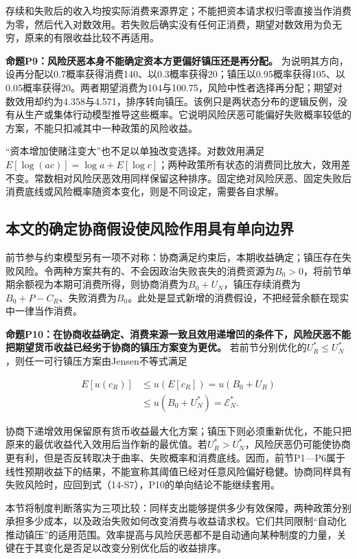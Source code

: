 \documentclass[UTF8,fontset=windows,12pt,a4paper,oneside,openany]{ctexbook}
\begin{document}
存续和失败后的收入均按实际消费来源界定；不能把资本请求权归零直接当作消费为零，然后代入对数效用。若失败后确实没有任何正消费，期望对数效用为负无穷，原来的有限收益比较不再适用。

\textbf{命题P9：风险厌恶本身不能确定资本方更偏好镇压还是再分配。} 为说明其方向，设再分配以0.7概率获得消费140、以0.3概率获得20；镇压以0.95概率获得105、以0.05概率获得20。两者期望消费为104与100.75，风险中性者选择再分配；期望对数效用却约为4.358与4.571，排序转向镇压。该例只是两状态分布的逻辑反例，没有从生产或集体行动模型推导这些概率。它说明风险厌恶可能偏好失败概率较低的方案，不能只扣减其中一种政策的风险收益。

“资本增加使赌注变大”也不足以单独改变选择。对数效用满足$E[\log(ac)]=\log a+E[\log c]$；两种政策所有状态的消费同比放大，效用差不变。常数相对风险厌恶效用同样保留这种排序。固定绝对风险厌恶、固定失败后消费底线或风险概率随资本变化，则是不同设定，需要各自求解。

\subsection{本文的确定协商假设使风险作用具有单向边界}

前节参与约束模型另有一项不对称：协商满足约束后，本期收益确定；镇压存在失败风险。令两种方案共有的、不会因政治失败丧失的消费资源为$B_0>0$，将前节单期余额视为本期可消费所得，则协商消费为$B_0+U_N$，镇压存续消费为$B_0+P-C_R$、失败消费为$B_0$。此处是显式新增的消费假设，不把经营余额在现实中一律当作消费。

\textbf{命题P10：在协商收益确定、消费来源一致且效用递增凹的条件下，风险厌恶不能把期望货币收益已经劣于协商的镇压方案变为更优。} 若前节分别优化的$U_R^*\leq U_N^*$，则任一可行镇压方案由Jensen不等式满足

\[
\begin{aligned}
E[u(c_R)]&\leq u(E[c_R])=u(B_0+U_R)\\
 &\leq u(B_0+U_N^*)=\mathcal E_N^*.
\end{aligned}
\tag{14-S8}
\]

协商下递增效用保留原有货币收益最大化方案；镇压下则必须重新优化，不能只把原来的最优收益代入效用后当作新的最优值。若$U_R^*>U_N^*$，风险厌恶仍可能使协商更有利，但是否反转取决于曲率、失败概率和消费底线。因而，前节P1—P6属于线性预期收益下的结果，不能宣称其阈值已经对任意风险偏好稳健。协商同样具有失败风险时，应回到式（14-S7），P10的单向结论不能继续套用。

本节将制度判断落实为三项比较：同样支出能够提供多少有效保障，两种政策分别承担多少成本，以及政治失败如何改变消费与收益请求权。它们共同限制“自动化推动镇压”的适用范围。效率提高与风险厌恶都不是自动通向某种制度的力量，关键在于其变化是否足以改变分别优化后的收益排序。
\end{document}
